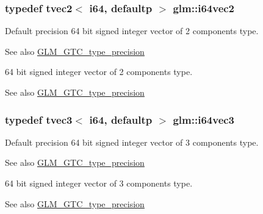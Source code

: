 \subsubsection[{i64vec2}]{\setlength{\rightskip}{0pt plus 5cm}typedef tvec2$<$ i64, defaultp $>$ {\bf glm\+::i64vec2}}\label{group__gtc__type__precision_ga5a03cb457be28a9a8b9e61163fe648a1}
Default precision 64 bit signed integer vector of 2 components type. \begin{DoxySeeAlso}{See also}
\hyperlink{group__gtc__type__precision}{G\+L\+M\+\_\+\+G\+T\+C\+\_\+type\+\_\+precision}
\end{DoxySeeAlso}
64 bit signed integer vector of 2 components type. \begin{DoxySeeAlso}{See also}
\hyperlink{group__gtc__type__precision}{G\+L\+M\+\_\+\+G\+T\+C\+\_\+type\+\_\+precision} 
\end{DoxySeeAlso}
\hypertarget{group__gtc__type__precision_ga189eb8d6a197bc491cabb6e1f120ecf4}{}
\subsubsection[{i64vec3}]{\setlength{\rightskip}{0pt plus 5cm}typedef tvec3$<$ i64, defaultp $>$ {\bf glm\+::i64vec3}}\label{group__gtc__type__precision_ga189eb8d6a197bc491cabb6e1f120ecf4}
Default precision 64 bit signed integer vector of 3 components type. \begin{DoxySeeAlso}{See also}
\hyperlink{group__gtc__type__precision}{G\+L\+M\+\_\+\+G\+T\+C\+\_\+type\+\_\+precision}
\end{DoxySeeAlso}
64 bit signed integer vector of 3 components type. \begin{DoxySeeAlso}{See also}
\hyperlink{group__gtc__type__precision}{G\+L\+M\+\_\+\+G\+T\+C\+\_\+type\+\_\+precision} 
\end{DoxySeeAlso}
\hypertarget{group__gtc__type__precision_gade5e969a6155752095d2cd603bda9408}{}

